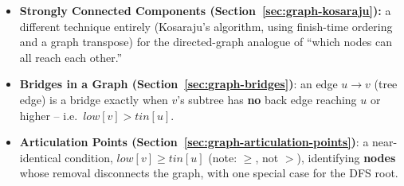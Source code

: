 \begin{patternbox}
\begin{itemize}
  \item \textbf{Strongly Connected Components (Section~\ref{sec:graph-kosaraju}):}
        a different technique entirely (Kosaraju's algorithm, using
        finish-time ordering and a graph transpose) for the directed-graph
        analogue of ``which nodes can all reach each other.''
  \item \textbf{Bridges in a Graph (Section~\ref{sec:graph-bridges})}:
        an edge $u\to v$ (tree edge) is a bridge exactly when
        $v$'s subtree has \textbf{no} back edge reaching $u$ or higher
        -- i.e.\ $\textit{low}[v] > \textit{tin}[u]$.
  \item \textbf{Articulation Points (Section~\ref{sec:graph-articulation-points})}:
        a near-identical condition, $\textit{low}[v] \ge
        \textit{tin}[u]$ (note: $\ge$, not $>$), identifying
        \textbf{nodes} whose removal disconnects the graph, with one
        special case for the DFS root.
\end{itemize}
\end{patternbox}

\newpage




